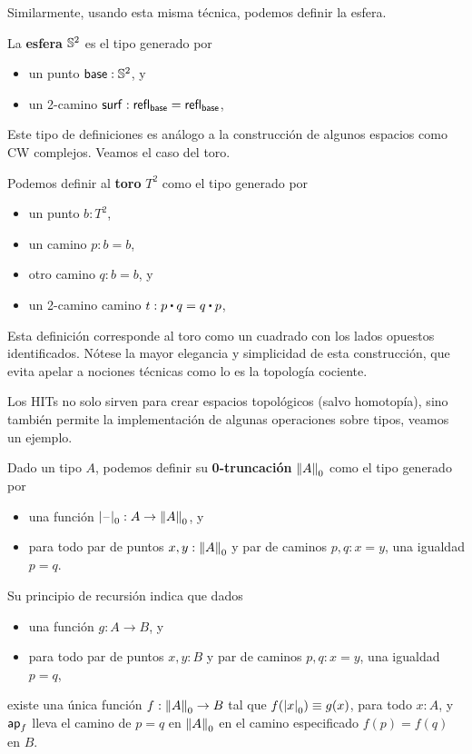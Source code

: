 \documentclass[../main.tex]{subfiles}
\begin{document}
Similarmente, usando esta misma t\'ecnica, podemos definir la esfera.
\begin{definition}
  La \textbf{esfera} $\Sn^2$ es el tipo generado por
  \begin{itemize}
    \item un punto $\base : \Sn^2$, y
    \item un 2-camino $\mathsf{surf} : \refl{\base}=\refl{\base}$,
  \end{itemize}
\end{definition}

Este tipo de definiciones es an\'alogo a la construcci\'on de algunos espacios como CW complejos. Veamos el caso del toro.
\begin{definition}
  Podemos definir al \textbf{toro} $T^2$ como el tipo generado por
  \begin{itemize}
    \item un punto $b : T^2$,
    \item un camino $p:b=b$,
    \item otro camino $q:b=b$, y
    \item un 2-camino camino $t:p\ct q= q \ct p$,
  \end{itemize}
\end{definition}
Esta definici\'on corresponde al toro como un cuadrado con los lados opuestos identificados. N\'otese la mayor elegancia y simplicidad de esta construcci\'on, que evita apelar a nociones t\'ecnicas como lo es la topolog\'ia cociente.

Los HITs no solo sirven para crear espacios topol\'ogicos (salvo homotop\'ia), sino tambi\'en permite la implementaci\'on de algunas operaciones sobre tipos, veamos un ejemplo.

\begin{definition}
  Dado un tipo $A$, podemos definir su \textbf{0-truncaci\'on} $\trunc0 A$ como el tipo generado por
  \begin{itemize}
    \item una funci\'on $\tprojf0 : A \to \trunc0 A$, y
    \item para todo par de puntos $x,y:\trunc0A$ y par de caminos $p,q:x=y$, una igualdad $p=q$.
  \end{itemize}
  Su principio de recursi\'on indica que dados
  \begin{itemize}
    \item una funci\'on $g: A \to B$, y
    \item para todo par de puntos $x,y:B$ y par de caminos $p,q:x=y$, una igualdad $p=q$,
  \end{itemize}
  existe una \'unica funci\'on $f: \trunc0 A \to B$ tal que $f(\tproj0x) \jdeq g(x)$, para todo $x:A$, y $\apfunc{f}$ lleva el camino de $p=q$ en $\trunc0 A$ en el camino especificado $f(p)=f(q)$ en $B$.
\end{definition}
\end{document}
